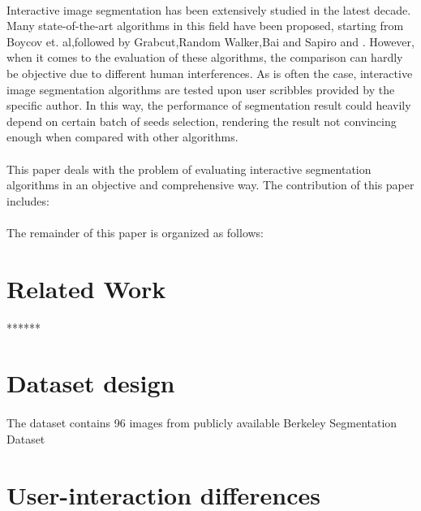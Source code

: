 \documentclass[runningheads,a4paper]{llncs}
\begin{document}
  \paragraph{}Interactive image segmentation has been extensively studied in the latest decade. Many state-of-the-art algorithms in this field have been proposed, starting from Boycov et. al\citep{boykov2001interactive},followed by Grabcut\citep{rother2004grabcut},Random Walker\citep{grady2006random},Bai and Sapiro \citep{bai2007geodesic} and \citep{gulshan2010geodesic}. However, when it comes to the evaluation of these algorithms, the comparison can hardly be objective due to different human interferences. As is often the case, interactive image segmentation algorithms are tested upon user scribbles provided by the specific author. In this way, the performance of segmentation result could heavily depend on certain batch of seeds selection, rendering the result not convincing enough when compared with other algorithms. 
 \paragraph{}This paper deals with the problem of evaluating interactive segmentation algorithms in an objective and comprehensive way. The contribution of this paper includes:
 \paragraph{} The remainder of this paper is organized as follows:
  
\section{Related Work}

******

\section{Dataset design}
\paragraph{}The dataset contains 96 images from publicly available Berkeley Segmentation Dataset\citep{martin2001database}

\section{User-interaction differences}






\end{document}
